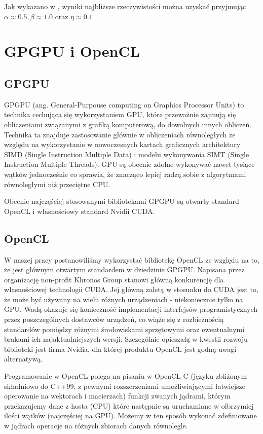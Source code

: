 \documentclass[polish, 12pt]{aghthesis}
\begin{document}
			Jak wykazano w \cite{Lombardi}, wyniki najbliższe rzeczywistości można uzyskać przyjmując $\alpha \approx 0.5, \beta \approx 1.0$ oraz $\eta \approx 0.1$
	
	\section{GPGPU i OpenCL}
		
		\subsection{GPGPU}
			GPGPU (ang. General-Purpouse computing on Graphics Processor Units) to technika cechująca się wykorzystaniem GPU, które przeważnie zajmują się obliczeniami związanymi z grafiką komputerową, do dowolnych innych obliczeń. Technika ta znajduje zastosowanie głównie w obliczeniach równoległych ze względu na wykorzystanie w nowoczesnych kartach graficznych architektury SIMD (Single Instruction Multiple Data) i modelu wykonywania SIMT (Single Instruction Multiple Threads). GPU są obecnie zdolne wykonywać nawet tysiące wątków jednocześnie co sprawia, że znacząco lepiej radzą sobie z algorytmami równoległymi niż przeciętne CPU. 
			

			Obecnie najczęściej stosowanymi bibliotekami GPGPU są otwarty standard OpenCL i własnościowy standard Nvidii CUDA.
		
		\subsection{OpenCL}
			W naszej pracy postanowiliśmy wykorzystać bibliotekę OpenCL ze względu na to, że jest głównym otwartym standardem w dziedzinie GPGPU. Napisana przez organizację non-profit Khronos Group stanowi główną konkurencję dla własnościowej technologii CUDA. Jej główną zaletą w stosunku do CUDA jest to, że może być używany na wielu różnych urządzeniach - niekoniecznie tylko na GPU. Wadą okazuje się konieczność implementacji interfejsów programistycznych przez poszczególnych dostawców urządzeń, co wiąże się z rozbieżnością standardów pomiędzy różnymi środowiskami sprzętowymi oraz ewentualnymi brakami ich najaktualniejszych wersji. Szczególnie opieszałą w kwestii rozwoju biblioteki jest firma Nvidia, dla której produktu OpenCL jest godną uwagi alternatywą.	

			Programowanie w OpenCL polega na pisaniu w OpenCL C (języku zbliżonym składniowo do C++99, z pewnymi rozszerzeniami umożliwiającymi łatwiejsze operowanie na wektorach i macierzach) funkcji zwanych jądrami, którym przekazujemy dane z hosta (CPU) które następnie są uruchamiane w olbrzymiej ilości wątków (najczęściej na GPU). Możemy w ten sposób wykonać zdefiniowane w jądrach operacje na różnych zbiorach danych równolegle. 
			
\end{document}
